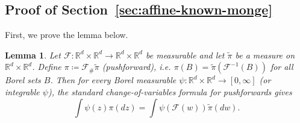 \documentclass{article}
\theoremstyle{plain}
\newtheorem{lemma}[theorem]{Lemma}
\theoremstyle{definition}
\theoremstyle{remark}
\numberwithin{equation}{section}
\newcommand{\R}{\mathbb{R}}
\begin{document}
\subsection{Proof of Section~\ref{sec:affine-known-monge}}
First, we prove the lemma below.
\begin{lemma}\label{lem:var-change}
Let $\mathcal F:\R^d\times\R^d\to\R^d\times\R^d$ be measurable and let $\widetilde\pi$ be a measure on $\R^d\times\R^d$.
Define $\pi\coloneqq \mathcal F_\#\widetilde\pi$ (pushforward), i.e. $\pi(B)=\widetilde\pi(\mathcal F^{-1}(B))$ for all Borel sets $B$.
Then for every Borel measurable $\psi:\R^d\times\R^d\to[0,\infty]$ (or integrable $\psi$), the standard change-of-variables formula for pushforwards gives
\begin{equation}
\int\psi(z)\pi(dz)=\int\psi(\mathcal F(w))\widetilde\pi(dw).
\end{equation}
\end{lemma}
\end{document}
